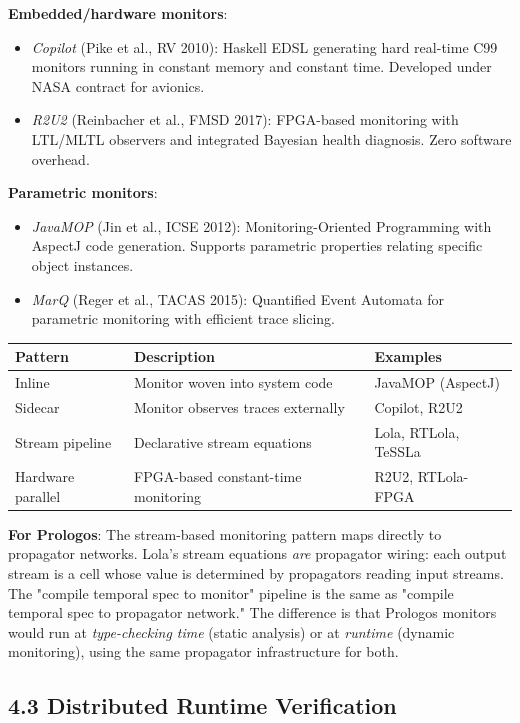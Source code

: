 \documentclass[11pt]{article}
\begin{document}
\textbf{Embedded/hardware monitors}:
\begin{itemize}
\item \emph{Copilot} (Pike et al., RV 2010): Haskell EDSL generating hard real-time
C99 monitors running in constant memory and constant time. Developed under
NASA contract for avionics.
\item \emph{R2U2} (Reinbacher et al., FMSD 2017): FPGA-based monitoring with LTL/MLTL
observers and integrated Bayesian health diagnosis. Zero software overhead.
\end{itemize}

\textbf{Parametric monitors}:
\begin{itemize}
\item \emph{JavaMOP} (Jin et al., ICSE 2012): Monitoring-Oriented Programming with
AspectJ code generation. Supports parametric properties relating specific
object instances.
\item \emph{MarQ} (Reger et al., TACAS 2015): Quantified Event Automata for
parametric monitoring with efficient trace slicing.
\end{itemize}

\begin{center}
\begin{tabular}{lll}
Pattern & Description & Examples\\
\hline
Inline & Monitor woven into system code & JavaMOP (AspectJ)\\
Sidecar & Monitor observes traces externally & Copilot, R2U2\\
Stream pipeline & Declarative stream equations & Lola, RTLola, TeSSLa\\
Hardware parallel & FPGA-based constant-time monitoring & R2U2, RTLola-FPGA\\
\end{tabular}
\end{center}

\textbf{For Prologos}: The stream-based monitoring pattern maps directly to propagator
networks. Lola's stream equations \emph{are} propagator wiring: each output stream
is a cell whose value is determined by propagators reading input streams. The
"compile temporal spec to monitor" pipeline is the same as "compile temporal
spec to propagator network." The difference is that Prologos monitors would
run at \emph{type-checking time} (static analysis) or at \emph{runtime} (dynamic
monitoring), using the same propagator infrastructure for both.
\subsection{4.3 Distributed Runtime Verification}
\label{sec:org73e99d0}
\end{document}
